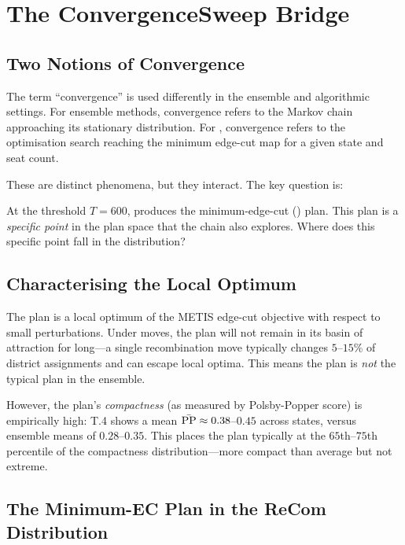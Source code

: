 \section{The ConvergenceSweep Bridge}
\label{sec:bridge}

\subsection{Two Notions of Convergence}

The term ``convergence'' is used differently in the ensemble and algorithmic
settings.  For ensemble methods, convergence refers to the Markov chain
approaching its stationary distribution.  For \cs{} \citep{dellaLibera2026b16},
convergence refers to the optimisation search reaching the minimum edge-cut
map for a given state and seat count.

These are distinct phenomena, but they interact.  The key question is:

\begin{keybox}
At the threshold $T = 600$, \cs{} produces the minimum-edge-cut (\ar{}) plan.
This plan is a \emph{specific point} in the plan space that the \recom{} chain
also explores.  Where does this specific point fall in the \recom{} distribution?
\end{keybox}

\subsection{Characterising the Local Optimum}

The \ar{} plan is a local optimum of the METIS edge-cut objective with
respect to small perturbations.  Under \recom{} moves, the plan will not
remain in its basin of attraction for long---a single recombination move
typically changes $5$--$15\%$ of district assignments and can escape local
optima.  This means the \ar{} plan is \emph{not} the typical plan in the
\recom{} ensemble.

However, the \ar{} plan's \emph{compactness} (as measured by Polsby-Popper
score) is empirically high: T.4 shows a mean $\bar{\mathrm{PP}} \approx 0.38$--$0.45$
across states, versus \recom{} ensemble means of $0.28$--$0.35$.  This
places the \ar{} plan typically at the $65$th--$75$th percentile of the
\recom{} compactness distribution---more compact than average but not extreme.

\subsection{The Minimum-EC Plan in the ReCom Distribution}

